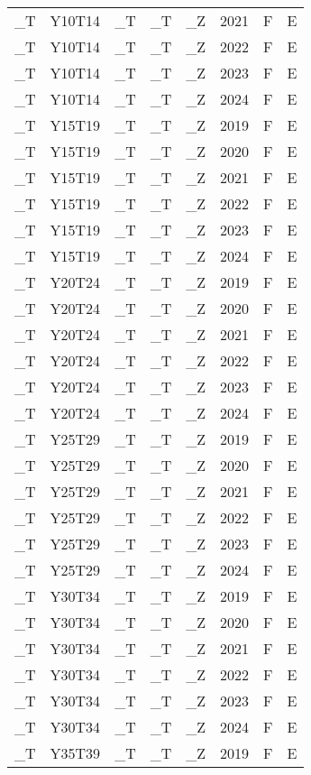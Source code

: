 \begin{longtable}[t]{llllllll}
\addlinespace
\_T & Y10T14 & \_T & \_T & \_Z & 2021 & F & E\\
\_T & Y10T14 & \_T & \_T & \_Z & 2022 & F & E\\
\_T & Y10T14 & \_T & \_T & \_Z & 2023 & F & E\\
\_T & Y10T14 & \_T & \_T & \_Z & 2024 & F & E\\
\_T & Y15T19 & \_T & \_T & \_Z & 2019 & F & E\\
\addlinespace
\_T & Y15T19 & \_T & \_T & \_Z & 2020 & F & E\\
\_T & Y15T19 & \_T & \_T & \_Z & 2021 & F & E\\
\_T & Y15T19 & \_T & \_T & \_Z & 2022 & F & E\\
\_T & Y15T19 & \_T & \_T & \_Z & 2023 & F & E\\
\_T & Y15T19 & \_T & \_T & \_Z & 2024 & F & E\\
\addlinespace
\_T & Y20T24 & \_T & \_T & \_Z & 2019 & F & E\\
\_T & Y20T24 & \_T & \_T & \_Z & 2020 & F & E\\
\_T & Y20T24 & \_T & \_T & \_Z & 2021 & F & E\\
\_T & Y20T24 & \_T & \_T & \_Z & 2022 & F & E\\
\_T & Y20T24 & \_T & \_T & \_Z & 2023 & F & E\\
\addlinespace
\_T & Y20T24 & \_T & \_T & \_Z & 2024 & F & E\\
\_T & Y25T29 & \_T & \_T & \_Z & 2019 & F & E\\
\_T & Y25T29 & \_T & \_T & \_Z & 2020 & F & E\\
\_T & Y25T29 & \_T & \_T & \_Z & 2021 & F & E\\
\_T & Y25T29 & \_T & \_T & \_Z & 2022 & F & E\\
\addlinespace
\_T & Y25T29 & \_T & \_T & \_Z & 2023 & F & E\\
\_T & Y25T29 & \_T & \_T & \_Z & 2024 & F & E\\
\_T & Y30T34 & \_T & \_T & \_Z & 2019 & F & E\\
\_T & Y30T34 & \_T & \_T & \_Z & 2020 & F & E\\
\_T & Y30T34 & \_T & \_T & \_Z & 2021 & F & E\\
\addlinespace
\_T & Y30T34 & \_T & \_T & \_Z & 2022 & F & E\\
\_T & Y30T34 & \_T & \_T & \_Z & 2023 & F & E\\
\_T & Y30T34 & \_T & \_T & \_Z & 2024 & F & E\\
\_T & Y35T39 & \_T & \_T & \_Z & 2019 & F & E\\

\end{longtable}
